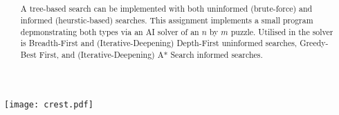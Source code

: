 \author
{
  { \authorname }
  { \small \scshape \studentid }
}
\date { \doccdate }
\title
{
  { \doctitle                         } \\
  { \slshape \normalsize \unitdesc    } \\
  { \scshape \normalsize \university  }
}

\maketitle

\begin{center}
  \texttt{[image: crest.pdf]}
\end{center}

\begin{abstract}
  A tree-based search can be implemented with both uninformed (brute-force) and
  informed (heurstic-based) searches. This assignment implements a small program
  depmonstrating both types via an AI solver of an $n$ by $m$ puzzle. Utilised
  in the solver is Breadth-First and (Iterative-Deepening) Depth-First uninformed
  searches, Greedy-Best First, and (Iterative-Deepening) A* Search informed
  searches.
\end{abstract}
